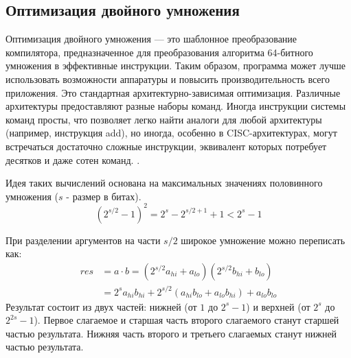 \subsection{Оптимизация двойного умножения}
Оптимизация двойного умножения — это шаблонное преобразование компилятора, предназначенное для преобразования алгоритма 64-битного умножения в  эффективные инструкции. Таким образом, программа может лучше использовать возможности аппаратуры и повысить производительность всего приложения. Это стандартная архитектурно-зависимая оптимизация. Различные архитектуры предоставляют разные наборы команд. Иногда инструкции системы команд просты, что позволяет легко найти аналоги для любой архитектуры (например, инструкция add), но иногда, особенно в CISC-архитектурах, могут встречаться достаточно сложные инструкции, эквивалент которых потребует десятков и даже сотен команд.  \cite{bansal2021reduced, isen2009tale}.


Идея таких вычислений основана на максимальных значениях половинного умножения ($s$ - размер в битах).
\begin{equation*} \label{eq1}
	\left(2^{s/2}-1\right)^2=2^s-2^{s/2+1}+1<2^s-1
\end{equation*}

При разделении аргументов на части $s/2$ широкое умножение можно переписать как:
\begin{equation*} \label{eq2}
	\begin{split}
		res& =a\cdot b =\left(2^{s/2}a_{hi}+a_{lo}\right)\left(2^{s/2}b_{hi}+b_{lo}\right) \\
		& =2^sa_{hi}b_{hi}+2^{s/2}\left(a_{hi}b_{lo}+a_{lo}b_{hi}\right)+a_{lo}b_{lo}  
	\end{split}
\end{equation*}
Результат состоит из двух частей: нижней (от $1$ до $2^s - 1$) и верхней (от $2^s$ до $2^{2s} -1$). Первое слагаемое  и старшая часть второго слагаемого станут старшей частью результата. Нижняя часть второго и третьего слагаемых станут  нижней частью результата.


